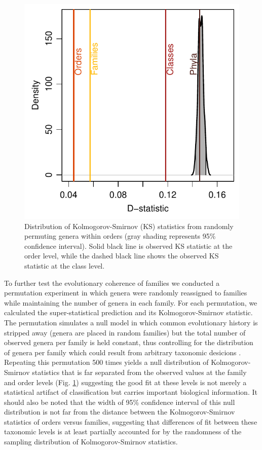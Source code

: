 \documentclass[12pt]{article}
\let\citep=\cite
\begin{document}
\begin{figure}[!h]
  \centering
  \includegraphics[scale=1]{../../fig_dStat.pdf}
  \caption[Goodness of super-statistical theory fit]{Distribution of
    Kolmogorov-Smirnov (KS) statistics from randomly permuting genera
    within orders (gray shading represents 95\% confidence
    interval). Solid black line is observed KS statistic at the order
    level, while the dashed black line shows the observed KS statistic
    at the class level.}
  \label{fig:dStat}
\end{figure}

To further test the evolutionary coherence of families we conducted a
permutation experiment in which genera were randomly reassigned to
families while maintaining the number of genera in each family. For
each permutation, we calculated the super-statistical prediction and
its Kolmogorov-Smirnov statistic. The permutation simulates a null
model in which common evolutionary history is stripped away (genera
are placed in random families) but the total number of observed genera
per family is held constant, thus controlling for the distribution of
genera per family which could result from arbitrary taxonomic
desicions \citep{YuleSomething}.  Repeating this permutation 500 times
yields a null distribution of Kolmogorov-Smirnov statistics that is
far separated from the observed values at the family and order levels
(Fig. \ref{fig:dStat}) suggesting the good fit at these levels is not
merely a statistical artifact of classification but carries important
biological information. It should also be noted that the width of 95\%
confidence interval of this null distribution is not far from the
distance between the Kolmogorov-Smirnov statistics of orders versus
families, suggesting that differences of fit between these taxonomic
levels is at least partially accounted for by the randomness of the
sampling distribution of Kolmogorov-Smirnov statistics.
\end{document}
